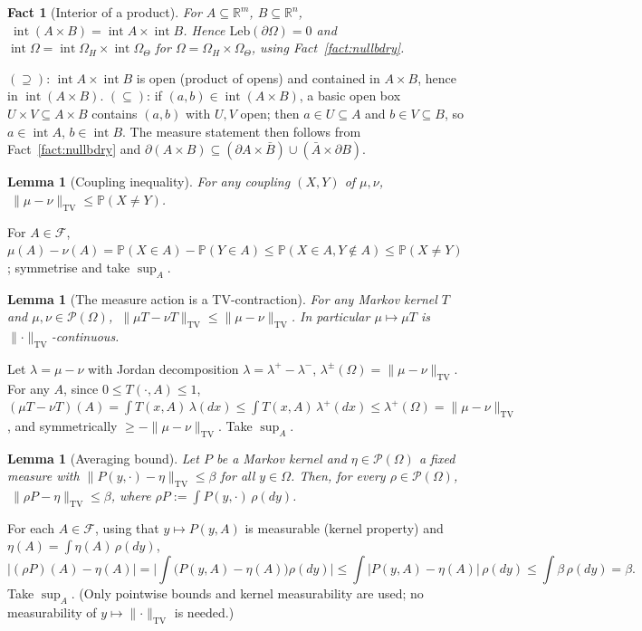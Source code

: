 \documentclass[11pt]{article}
\makeatletter
\theoremstyle{definitionbreak}
\theoremstyle{plainbreak}
\newtheorem{lemma}[theorem]{Lemma}
\newtheorem{fact}[theorem]{Fact}
\theoremstyle{remarkbreak}
\renewenvironment{proof}[1][\proofname]{\par
  \pushQED{\qed}\normalfont
  \topsep6\p@\@plus6\p@\relax
  \trivlist
  \item[\hskip\labelsep\itshape #1\@addpunct{.}]\mbox{}\par\nobreak\ignorespaces
}{\popQED\endtrivlist\@endpefalse}
\newcommand{\R}{\mathbb{R}}
\newcommand{\Prob}{\mathbb{P}}
\newcommand{\cF}{\mathcal{F}}
\newcommand{\cP}{\mathcal{P}}
\newcommand{\Om}{\Omega}
\newcommand{\Leb}{\mathrm{Leb}}
\newcommand{\TV}{\mathrm{TV}}
\DeclareMathOperator{\intr}{int}
\newcommand{\norm}[1]{\lVert #1 \rVert}
\newcommand{\abs}[1]{\lvert #1 \rvert}
\makeatother
\begin{document}
\begin{fact}[Interior of a product]
\label{fact:prodint}
For $A\subseteq\R^m$, $B\subseteq\R^n$, $\ \intr(A\times B)=\intr A\times\intr B$.
Hence $\Leb(\partial\Om)=0$ and $\intr\Om=\intr\Om_H\times\intr\Om_\Theta$ for
$\Om=\Om_H\times\Om_\Theta$, using Fact~\ref{fact:nullbdry}.
\end{fact}
\begin{proof}
$(\supseteq)$: $\intr A\times\intr B$ is open (product of opens) and contained in $A\times B$, hence
in $\intr(A\times B)$. $(\subseteq)$: if $(a,b)\in\intr(A\times B)$, a basic open box
$U\times V\subseteq A\times B$ contains $(a,b)$ with $U,V$ open; then $a\in U\subseteq A$ and
$b\in V\subseteq B$, so $a\in\intr A$, $b\in\intr B$. The measure statement then follows from
Fact~\ref{fact:nullbdry} and
$\partial(A\times B)\subseteq(\partial A\times \bar B)\cup(\bar A\times\partial B)$.
\end{proof}

\begin{lemma}[Coupling inequality]
\label{lem:coupling}
For any coupling $(X,Y)$ of $\mu,\nu$, $\ \norm{\mu-\nu}_\TV\le\Prob(X\neq Y)$.
\end{lemma}
\begin{proof}
For $A\in\cF$, $\mu(A)-\nu(A)=\Prob(X\in A)-\Prob(Y\in A)\le\Prob(X\in A,Y\notin A)\le\Prob(X\neq Y)$;
symmetrise and take $\sup_A$.
\end{proof}

\begin{lemma}[The measure action is a TV-contraction]
\label{lem:nonexp}
For any Markov kernel $T$ and $\mu,\nu\in\cP(\Om)$, $\ \norm{\mu T-\nu T}_\TV\le\norm{\mu-\nu}_\TV$.
In particular $\mu\mapsto\mu T$ is $\norm{\cdot}_\TV$-continuous.
\end{lemma}
\begin{proof}
Let $\lambda=\mu-\nu$ with Jordan decomposition $\lambda=\lambda^+-\lambda^-$,
$\lambda^\pm(\Om)=\norm{\mu-\nu}_\TV$. For any $A$, since $0\le T(\cdot,A)\le1$,
$(\mu T-\nu T)(A)=\int T(x,A)\,\lambda(dx)\le\int T(x,A)\,\lambda^+(dx)\le\lambda^+(\Om)=\norm{\mu-\nu}_\TV$,
and symmetrically $\ge-\norm{\mu-\nu}_\TV$. Take $\sup_A$.
\end{proof}

\begin{lemma}[Averaging bound]
\label{lem:avg}
Let $P$ be a Markov kernel and $\eta\in\cP(\Om)$ a fixed measure with
$\norm{P(y,\cdot)-\eta}_\TV\le\beta$ for all $y\in\Om$. Then, for every $\rho\in\cP(\Om)$,
$\ \norm{\rho P-\eta}_\TV\le\beta$, where $\rho P:=\int P(y,\cdot)\,\rho(dy)$.
\end{lemma}
\begin{proof}
For each $A\in\cF$, using that $y\mapsto P(y,A)$ is measurable (kernel property) and
$\eta(A)=\int\eta(A)\,\rho(dy)$,
\[
  \abs{(\rho P)(A)-\eta(A)}=\biggl|\int\big(P(y,A)-\eta(A)\big)\rho(dy)\biggr|
  \le\int\abs{P(y,A)-\eta(A)}\,\rho(dy)\le\int\beta\,\rho(dy)=\beta .
\]
Take $\sup_A$. (Only pointwise bounds and kernel measurability are used; no measurability of
$y\mapsto\norm{\cdot}_\TV$ is needed.)
\end{proof}
\end{document}
